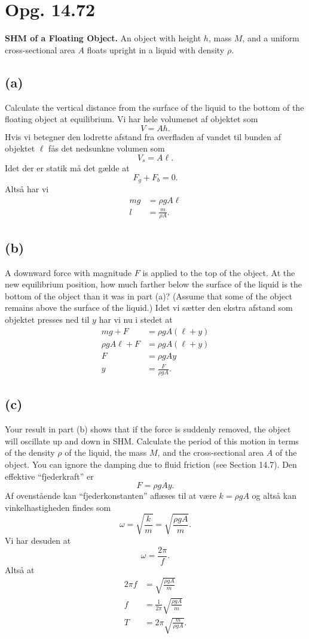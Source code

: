 \documentclass[12pt]{article}
\theoremstyle{definition}
\begin{document}
\section*{Opg. 14.72}
\textbf{SHM of a Floating Object.} An object with height $h$, mass $M$, and a uniform cross-sectional area $A$ floats upright in a liquid with density $\rho$.

\subsection*{(a)}
Calculate the vertical distance from the surface of the liquid to the bottom of the floating object at equilibrium.
\bigbreak
Vi har hele volumenet af objektet som
\[ 
V = Ah
.\]
Hvis vi betegner den lodrette afstand fra overfladen af vandet til bunden af objektet $\ell$ fås det nedsunkne volumen som
\[
  V_{s} = A \ell
.\]
Idet der er statik må det gælde at
\[ 
F_g + F_b = 0
.\]
Altså har vi
\begin{align*}
  mg &= \rho g A \ell \\
  l &= \frac{m}{\rho A}
.\end{align*}



\subsection*{(b)}
A downward force with magnitude $F$ is applied to the top of the object. At the new equilibrium position, how much farther below the surface of the liquid is the bottom of the object than it was in part (a)? (Assume that some of the object remains above the surface of the liquid.)
\bigbreak
Idet vi sætter den ekstra afstand som objektet presses ned til $y$ har vi nu i stedet at
\begin{align*}
  mg + F &= \rho g A (\ell + y) \\
  \rho g A \ell + F &= \rho g A (\ell + y) \\
  F &= \rho g A y \\
  y &= \frac{F}{\rho g A}
.\end{align*}




\subsection*{(c)}
Your result in part (b) shows that if the force is suddenly removed, the object will oscillate up and down in SHM. Calculate the period of this motion in terms of the density $\rho$ of the liquid, the mass $M$, and the cross-sectional area $A$ of the object. You can ignore the damping due to fluid friction (see Section 14.7).
\bigbreak
Den effektive ``fjederkraft'' er
\[ 
F = \rho g A y
.\]
Af ovenstående kan ``fjederkonstanten'' aflæses til at være $k = \rho g A$ og altså kan vinkelhastigheden findes som
\[ 
\omega = \sqrt{\frac{k}{m}} = \sqrt{\frac{\rho g A}{m}}
.\]
Vi har desuden at 
\[ 
\omega = \frac{2\pi}{f}
.\]
Altså at
\begin{align*}
  2\pi f &= \sqrt{\frac{\rho g A}{m}} \\
  f &= \frac{1}{2\pi} \sqrt{\frac{\rho gA}{m}} \\
  T &= 2\pi \sqrt{\frac{m}{\rho gA}}
.\end{align*}
\end{document}
